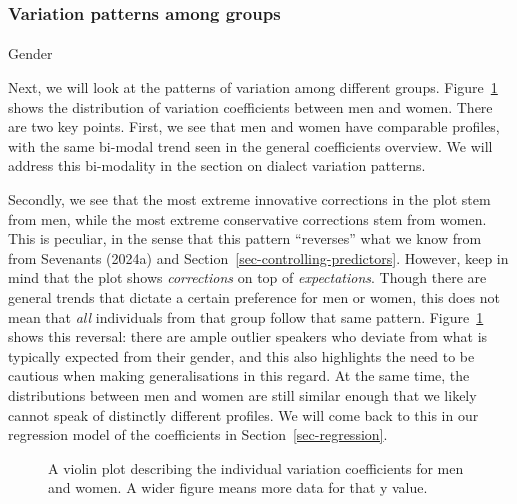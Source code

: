 \documentclass[
  letterpaper,
  DIV=11,
  numbers=noendperiod,
  oneside]{scrartcl}
\makeatletter
\let\oldparagraph\paragraph
\renewcommand{\paragraph}{
    \@ifstar
      \xxxParagraphStar
      \xxxParagraphNoStar
  }
\newcommand{\xxxParagraphStar}[1]{\oldparagraph*{#1}\mbox{}}
\newcommand{\xxxParagraphNoStar}[1]{\oldparagraph{#1}\mbox{}}
\makeatother
\begin{document}
\subsubsection{Variation patterns among
groups}\label{sec-group-variation}

\paragraph{Gender}\label{gender}

Next, we will look at the patterns of variation among different groups.
Figure~\ref{fig-gender-violin} shows the distribution of variation
coefficients between men and women. There are two key points. First, we
see that men and women have comparable profiles, with the same bi-modal
trend seen in the general coefficients overview. We will address this
bi-modality in the section on dialect variation patterns.

Secondly, we see that the most extreme innovative corrections in the
plot stem from men, while the most extreme conservative corrections stem
from women. This is peculiar, in the sense that this pattern
``reverses'' what we know from from Sevenants (2024a) and
Section~\ref{sec-controlling-predictors}. However, keep in mind that the
plot shows \emph{corrections} on top of \emph{expectations}. Though
there are general trends that dictate a certain preference for men or
women, this does not mean that \emph{all} individuals from that group
follow that same pattern. Figure~\ref{fig-gender-violin} shows this
reversal: there are ample outlier speakers who deviate from what is
typically expected from their gender, and this also highlights the need
to be cautious when making generalisations in this regard. At the same
time, the distributions between men and women are still similar enough
that we likely cannot speak of distinctly different profiles. We will
come back to this in our regression model of the coefficients in
Section~\ref{sec-regression}.

\begin{figure}


\caption{\label{fig-gender-violin}A violin plot describing the
individual variation coefficients for men and women. A wider figure
means more data for that y value.}

\end{figure}%
\end{document}
